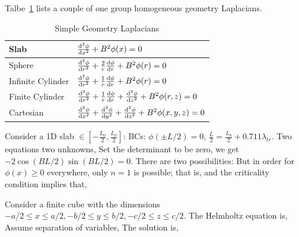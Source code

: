\documentclass{school-22.211-notes}
\begin{document}
Talbe~\ref{simple-geometry-laplacian} lists a couple of one group homogeneous geometry Laplacians. 
\begin{table}
  \centering
  \begin{tabular}{|l|l|} \hline
    Slab & $\frac{\mathrm{d}^{2}\phi}{\mathrm{d}x^{2}} + B^2 \phi(x) = 0$ \\ \hline
    Sphere & $\frac{\mathrm{d}^{2}\phi}{\mathrm{d}r^{2}} + \frac{2}{r} \frac{\mathrm{d}\phi}{\mathrm{d}r} + B^2 \phi(r) = 0$ \\ \hline
    Infinite Cylinder & $\frac{\mathrm{d}^{2}\phi}{\mathrm{d}r^{2}} + \frac{1}{r} \frac{\mathrm{d}\phi}{\mathrm{d}r} + B^2 \phi(r) = 0$ \\ \hline
    Finite Cylinder & $\frac{\mathrm{d}^{2}\phi}{\mathrm{d}r^{2}} + \frac{1}{r} \frac{\mathrm{d}\phi}{\mathrm{d}r} + \frac{\mathrm{d}^{2}\phi}{\mathrm{d}z^{2}} + B^2 \phi(r,z) = 0$ \\ \hline
    Cartesian & $\frac{\mathrm{d}^{2}\phi}{\mathrm{d}x^{2}} + \frac{\mathrm{d}^{2}\phi}{\mathrm{d}y^{2}} + \frac{\mathrm{d}^{2}\phi}{\mathrm{d}z^{2}} + B^2 \phi(x,y,z) = 0$ \\ \hline
  \end{tabular}
\caption{Simple Geometry Laplacians} \label{simple-geometry-laplacian}
\end{table}




\clearpage
{}
 Consider a 1D slab $\in  \left[- \frac{L_0}{2}, \frac{L_0}{2} \right]$:
BCs: $\phi(\pm L/2) = 0$, $\frac{L}{2} = \frac{L_0}{2} + 0.711 \lambda_{tr}$. Two equations two unknowns, 
  Set the determinant to be zero, we get $-2 \cos (BL/2) \sin (BL/2) = 0$. There are two possibilities: 
But in order for $\phi(x) \ge 0$ everywhere, only $n=1$ is possible; that is, 
and the criticality condition implies that, 

\clearpage
{}
Consider a finite cube with the dimensions $-a/2 \le x \le a/2, -b/2 \le y \le b/2, -c/2 \le z \le c/2$. The Helmholtz equation is,
Assume separation of variables,
The solution is, 
\end{document}
